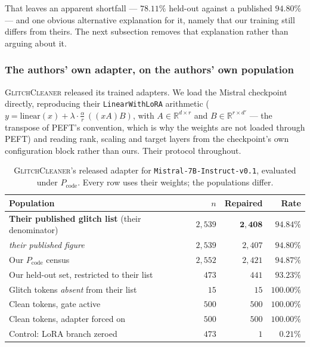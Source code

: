 \documentclass[11pt,a4paper]{article}
\newcommand{\gc}{\textsc{GlitchCleaner}}
\newcommand{\Pcode}{$P_{\mathrm{code}}$}
\begin{document}
That leaves an apparent shortfall --- $78.11\%$ held-out against a published
$94.80\%$ --- and one obvious alternative explanation for it, namely that our
training still differs from theirs. The next subsection removes that explanation
rather than arguing about it.

\subsubsection{The authors' own adapter, on the authors' own population}
\label{sec:upstream}

\gc{} released its trained adapters. We load the Mistral checkpoint directly,
reproducing their \texttt{LinearWithLoRA} arithmetic
($y = \mathrm{linear}(x) + \lambda \cdot \tfrac{\alpha}{r}\,((x A) B)$, with
$A \in \mathbb{R}^{d \times r}$ and $B \in \mathbb{R}^{r \times d'}$ --- the
transpose of PEFT's convention, which is why the weights are not loaded through
PEFT) and reading rank, scaling and target layers from the checkpoint's own
configuration block rather than ours. Their protocol throughout.

\begin{table}[h]
\centering
\caption{\gc{}'s released adapter for \texttt{Mistral-7B-Instruct-v0.1}, evaluated
under \Pcode{}. Every row uses their weights; the populations differ.}
\label{tab:upstream}
\begin{tabular}{lrrr}
\toprule
Population & $n$ & Repaired & Rate \\
\midrule
\textbf{Their published glitch list} (their denominator) & $2{,}539$ & $\mathbf{2{,}408}$ & $\mathbf{94.84\%}$ \\
\quad \emph{their published figure} & $2{,}539$ & \emph{$2{,}407$} & \emph{$94.80\%$} \\
\midrule
Our \Pcode{} census & $2{,}552$ & $2{,}421$ & $94.87\%$ \\
Our held-out set, restricted to their list & $473$ & $441$ & $93.23\%$ \\
Glitch tokens \emph{absent} from their list & $15$ & $15$ & $100.00\%$ \\
\midrule
Clean tokens, gate active & $500$ & $500$ & $100.00\%$ \\
Clean tokens, adapter forced on & $500$ & $500$ & $100.00\%$ \\
Control: LoRA branch zeroed & $473$ & $1$ & $0.21\%$ \\
\bottomrule
\end{tabular}
\end{table}
\end{document}
